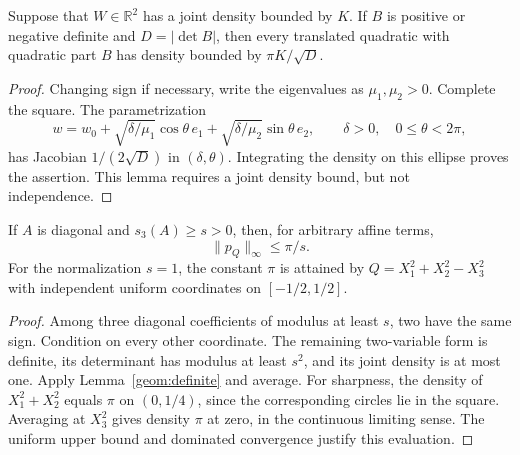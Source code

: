 \begin{lemma}\label{geom:definite}
Suppose that $W\in\mathbb R^2$ has a joint density bounded by $K$. If $B$ is positive or negative definite and $D=|\det B|$, then every translated quadratic with quadratic part $B$ has density bounded by $\pi K/\sqrt D$.
\end{lemma}
\begin{proof}
Changing sign if necessary, write the eigenvalues as $\mu_1,\mu_2>0$. Complete the square. The parametrization
\[
 w=w_0+\sqrt{\delta/\mu_1}\cos\theta\,e_1
       +\sqrt{\delta/\mu_2}\sin\theta\,e_2,
 \qquad \delta>0,\quad0\le\theta<2\pi,
\]
has Jacobian $1/(2\sqrt D)$ in $(\delta,\theta)$. Integrating the density on this ellipse proves the assertion. This lemma requires a joint density bound, but not independence.
\end{proof}

\begin{theorem}\label{geom:diagonal}
If $A$ is diagonal and $s_3(A)\ge s>0$, then, for arbitrary affine terms,
\[
 \|p_Q\|_\infty\le\pi/s.
\]
For the normalization $s=1$, the constant $\pi$ is attained by
$Q=X_1^2+X_2^2-X_3^2$ with independent uniform coordinates on $[-1/2,1/2]$.
\end{theorem}
\begin{proof}
Among three diagonal coefficients of modulus at least $s$, two have the same sign. Condition on every other coordinate. The remaining two-variable form is definite, its determinant has modulus at least $s^2$, and its joint density is at most one. Apply Lemma~\ref{geom:definite} and average. For sharpness, the density of $X_1^2+X_2^2$ equals $\pi$ on $(0,1/4)$, since the corresponding circles lie in the square. Averaging at $X_3^2$ gives density $\pi$ at zero, in the continuous limiting sense. The uniform upper bound and dominated convergence justify this evaluation.
\end{proof}

